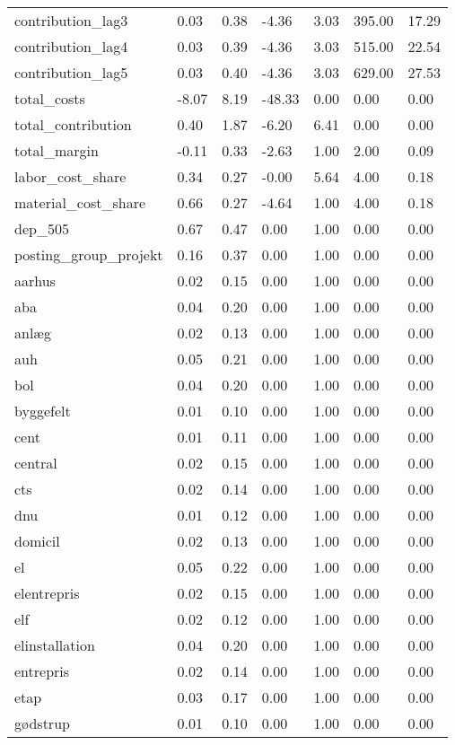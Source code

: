 \begin{landscape}
\begin{longtable}[h!]{lllllll}
contribution_lag3 & 0.03 & 0.38 & -4.36 & 3.03 & 395.00 & 17.29 \\
contribution_lag4 & 0.03 & 0.39 & -4.36 & 3.03 & 515.00 & 22.54 \\
contribution_lag5 & 0.03 & 0.40 & -4.36 & 3.03 & 629.00 & 27.53 \\
total_costs & -8.07 & 8.19 & -48.33 & 0.00 & 0.00 & 0.00 \\
total_contribution & 0.40 & 1.87 & -6.20 & 6.41 & 0.00 & 0.00 \\
total_margin & -0.11 & 0.33 & -2.63 & 1.00 & 2.00 & 0.09 \\
labor_cost_share & 0.34 & 0.27 & -0.00 & 5.64 & 4.00 & 0.18 \\
material_cost_share & 0.66 & 0.27 & -4.64 & 1.00 & 4.00 & 0.18 \\
dep_505 & 0.67 & 0.47 & 0.00 & 1.00 & 0.00 & 0.00 \\
posting_group_projekt & 0.16 & 0.37 & 0.00 & 1.00 & 0.00 & 0.00 \\
aarhus & 0.02 & 0.15 & 0.00 & 1.00 & 0.00 & 0.00 \\
aba & 0.04 & 0.20 & 0.00 & 1.00 & 0.00 & 0.00 \\
anlæg & 0.02 & 0.13 & 0.00 & 1.00 & 0.00 & 0.00 \\
auh & 0.05 & 0.21 & 0.00 & 1.00 & 0.00 & 0.00 \\
bol & 0.04 & 0.20 & 0.00 & 1.00 & 0.00 & 0.00 \\
byggefelt & 0.01 & 0.10 & 0.00 & 1.00 & 0.00 & 0.00 \\
cent & 0.01 & 0.11 & 0.00 & 1.00 & 0.00 & 0.00 \\
central & 0.02 & 0.15 & 0.00 & 1.00 & 0.00 & 0.00 \\
cts & 0.02 & 0.14 & 0.00 & 1.00 & 0.00 & 0.00 \\
dnu & 0.01 & 0.12 & 0.00 & 1.00 & 0.00 & 0.00 \\
domicil & 0.02 & 0.13 & 0.00 & 1.00 & 0.00 & 0.00 \\
el & 0.05 & 0.22 & 0.00 & 1.00 & 0.00 & 0.00 \\
elentrepris & 0.02 & 0.15 & 0.00 & 1.00 & 0.00 & 0.00 \\
elf & 0.02 & 0.12 & 0.00 & 1.00 & 0.00 & 0.00 \\
elinstallation & 0.04 & 0.20 & 0.00 & 1.00 & 0.00 & 0.00 \\
entrepris & 0.02 & 0.14 & 0.00 & 1.00 & 0.00 & 0.00 \\
etap & 0.03 & 0.17 & 0.00 & 1.00 & 0.00 & 0.00 \\
gødstrup & 0.01 & 0.10 & 0.00 & 1.00 & 0.00 & 0.00 \\

\end{longtable}
\end{landscape}
